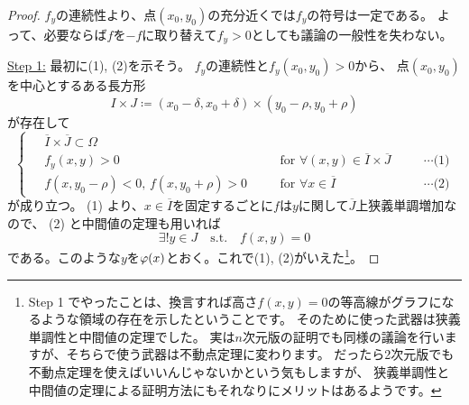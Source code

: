 \documentclass[report]{jlreq}
\begin{document}
\begin{proof}
    $f_y$の連続性より、点$(x_0, y_0)$の充分近くでは$f_y$の符号は一定である。
    よって、必要ならば$f$を$-f$に取り替えて$f_y > 0$としても議論の一般性を失わない。

    \underline{Step 1:} 最初に(1), (2)を示そう。
    $f_y$の連続性と$f_y(x_0, y_0) > 0$から、
    点$(x_0, y_0)$を中心とするある長方形
    \begin{equation}
        I \times J
            \coloneqq (x_0 - \delta, x_0 + \delta) \times (y_0 - \rho, y_0 + \rho)
    \end{equation}
    が存在して
    \begin{equation}
        \left\{\begin{alignedat}{3}
            &\; \overline{I} \times \overline{J} \subset \Omega \\
            &\; f_y(x, y) > 0
                \quad &&\text{for $\forall (x, y) \in \overline{I} \times \overline{J}$}
                \quad &&\cdots \text{(1)} \\
            &\; f(x, y_0 - \rho) < 0,\, f(x, y_0 + \rho) > 0
                \quad &&\text{for $\forall x \in \overline{I}$}
                \quad &&\cdots \text{(2)}
        \end{alignedat}\right.
    \end{equation}
    が成り立つ。
    (1) より、$x \in \overline{I}$を固定するごとに$f$は$y$に関して$\overline{J}$上狭義単調増加なので、
    (2) と中間値の定理も用いれば
    \begin{equation}
        \exists! y \in J \quad \text{s.t.} \quad f(x, y) = 0
        \label{6:eq:1}
    \end{equation}
    である。このような$y$を$\varphi(x)$とおく。これで(1), (2)がいえた\footnote{
        Step 1 でやったことは、換言すれば高さ$f(x, y) = 0$の等高線がグラフになるような領域の存在を示したということです。
        そのために使った武器は狭義単調性と中間値の定理でした。
        実は$n$次元版の証明でも同様の議論を行いますが、そちらで使う武器は不動点定理に変わります。
        だったら2次元版でも不動点定理を使えばいいんじゃないかという気もしますが、
        狭義単調性と中間値の定理による証明方法にもそれなりにメリットはあるようです\cite{杉浦85}。
    }。


\end{proof}
\end{document}
